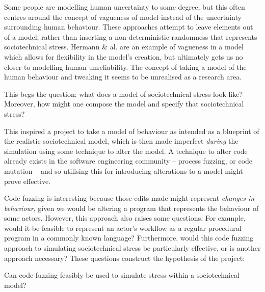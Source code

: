 Some people are modelling human uncertainty to some degree, but this often centres around the concept of vagueness of model instead of the uncertainty surrounding human behaviour. These approaches attempt to leave elements out of a model, rather than inserting a non-deterministic randomness that represents sociotechnical stress. Hermann \& al.\cite{Herrmann1999} are an example of vagueness in a model which allows for flexibility in the model's creation, but ultimately gets us no closer to modelling human unreliability. The concept of taking a model of the human behaviour and tweaking it seems to be unrealised as a research area. \par%

This begs the question: what does a model of sociotechnical stress look like? Moreover, how might one compose the model and specify that sociotechnical stress? \par%

This inspired a project to take a model of behaviour as intended as a blueprint of the realistic sociotechnical model, which is then made imperfect \emph{during} the simulation using some technique to alter the model. A technique to alter code already exists in the software engineering community -- process fuzzing, or code mutation\cite{Miller1988} -- and so utilising this for introducing alterations to a model might prove effective. \par%

Code fuzzing is interesting because those edits made might represent \emph{changes in behaviour}, given we would be altering a program that represents the behaviour of some actors. However, this approach also raises some questions. For example, would it be feasible to represent an actor's workflow as a regular procedural program in a commonly known language? Furthermore, would this code fuzzing approach to simulating sociotechnical stress be particularly effective, or is another approach necessary? These questions construct the hypothesis of the project: 
\begin{displayquote}
Can code fuzzing feasibly be used to simulate stress within a sociotechnical model?
\end{displayquote}%


